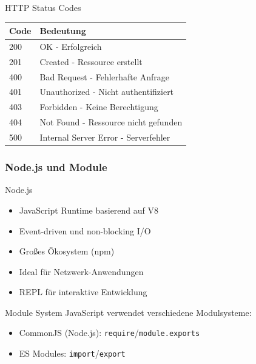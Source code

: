 \begin{corollary}{HTTP Status Codes}
    \begin{center}
    \begin{tabular}{|l|l|}
    \hline
    Code & Bedeutung \\
    \hline
    200 & OK - Erfolgreich \\
    \hline
    201 & Created - Ressource erstellt \\
    \hline
    400 & Bad Request - Fehlerhafte Anfrage \\
    \hline
    401 & Unauthorized - Nicht authentifiziert \\
    \hline
    403 & Forbidden - Keine Berechtigung \\
    \hline
    404 & Not Found - Ressource nicht gefunden \\
    \hline
    500 & Internal Server Error - Serverfehler \\
    \hline
    \end{tabular}
    \end{center}
\end{corollary}
\columnbreak

\subsubsection{Node.js und Module}

\begin{concept}{Node.js}
    \begin{itemize}
        \item JavaScript Runtime basierend auf V8
        \item Event-driven und non-blocking I/O
        \item Großes Ökosystem (npm)
        \item Ideal für Netzwerk-Anwendungen
        \item REPL für interaktive Entwicklung
    \end{itemize}
\end{concept}

\begin{concept}{Module System}
    JavaScript verwendet verschiedene Modulsysteme:
    \begin{itemize}
        \item CommonJS (Node.js): \texttt{require}/\texttt{module.exports}
        \item ES Modules: \texttt{import}/\texttt{export}
    \end{itemize}
\end{concept}

